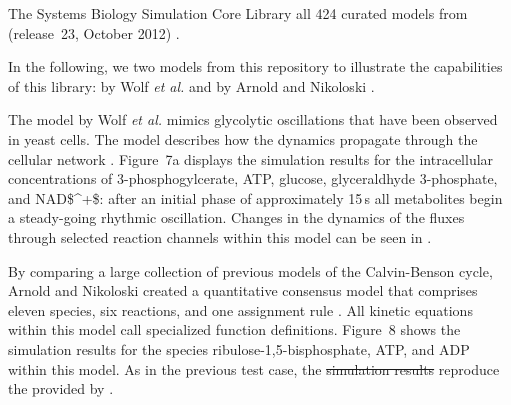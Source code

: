 \documentclass[10pt]{bmc_article}
\newenvironment{bmcformat}{\fussy\setboolean{publ}{true}}{\fussy}
\begin{document}
\begin{bmcformat}
The Systems Biology Simulation Core Library 
all 424 curated models from 
(release~23, October 2012) .

In the following, we  two models 
from this repository to illustrate the capabilities of this library:
 by Wolf \emph{et al.} \cite{Wolf2000} and
 by Arnold 
and Nikoloski \cite{Arnold2011}.

The model by Wolf \emph{et al.} \cite{Wolf2000} mimics glycolytic oscillations
that have been observed in yeast cells.
The model describes how the dynamics propagate through the cellular network
.
Figure~7a displays the simulation results for the intracellular concentrations
of 3-phosphogylcerate, \acs{ATP}, glucose, glyceraldhyde 3-phosphate, and 
\acs{NAD$^+$}:
after an initial phase of approximately 15\,s all metabolites begin a
steady-going rhythmic oscillation.
Changes in the dynamics of the fluxes through selected reaction channels within
this model can be seen in . 

By comparing a large collection of previous models of the Calvin-Benson
cycle, Arnold and Nikoloski created a quantitative consensus model that
comprises eleven species, six reactions, and one assignment rule
\cite{Arnold2011}.
All kinetic equations within this model call specialized function definitions.
Figure~8 shows the simulation results for the species ribulose-1,5-bisphosphate,
\acs{ATP}, and \acs{ADP} within this model.
As in the previous test case, the
\sout{simulation results}
reproduce the  provided by .  


\end{bmcformat}
\end{document}
